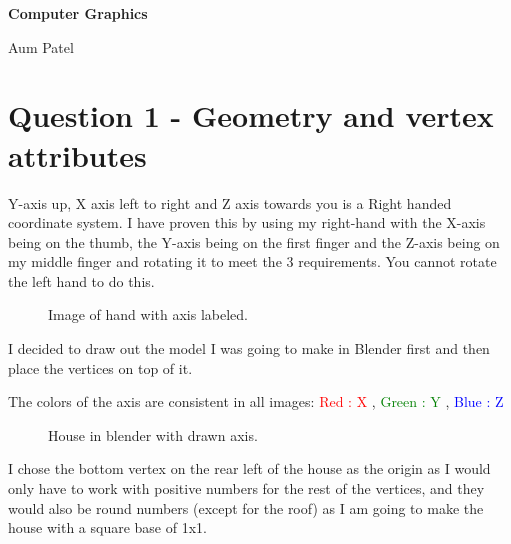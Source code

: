 \documentclass[10pt]{report}
\begin{document}
\begin{titlepage}
\center
{\huge\bfseries Computer Graphics 

Aum Patel
}

\end{titlepage}
\tableofcontents
\chapter{Question 1 - Geometry and vertex attributes}

Y-axis up, X axis left to right and Z axis towards you is a Right handed coordinate system. I have proven this by using my right-hand with the X-axis being on the thumb, the Y-axis being on the first finger and the Z-axis being on my middle finger and rotating it to meet the 3 requirements. You cannot rotate the left hand to do this.

\begin{figure}[H]
    \centering
    \caption{Image of hand with axis labeled.}
\end{figure}

I decided to draw out the model I was going to make in Blender first and then place the vertices on top of it. 

The colors of the axis are consistent in all images: \textcolor{red}{Red : X} , \textcolor{green}{Green : Y} , \textcolor{blue}{Blue : Z}

\begin{figure}[H]
    \centering
    \caption{House in blender with drawn axis.}
\end{figure}

I chose the bottom vertex on the rear left of the house as the origin as I would only have to work with positive numbers for the rest of the vertices, and they would also be round numbers (except for the roof) as I am going to make the house with a square base of 1x1. 
\end{document}

